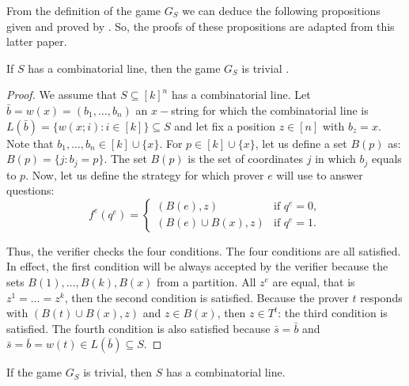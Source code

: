 From the definition of the game $G_S$ we can deduce the following propositions given and proved by \cite{hkazla2016forbidden}. So, the proofs of these propositions are adapted from this latter paper.  
\begin{pro} If $S$ has a combinatorial line, then the game $G_S$ is trivial	. \label{pr1}	\end{pro}
\begin{proof}
We assume that $S \subseteq [k]^n$ has a combinatorial line. 
Let $\bar{b}=w(x)=(b_1,\ldots, b_n)$ an $x-$string for which the  combinatorial line is $L(\bar{b})=\{w(x;i): i \in [k]\} \subseteq S$ and let fix a position $z \in [n]$ with $b_z=x$. Note that $b_1,\ldots, b_n \in [k] \cup \{x\}$. For $p \in [k] \cup \{x\}$, let us define a set $B(p)$ as: $B(p)=\{j: b_j=p\}$. The set $B(p)$ is the set of coordinates $j$ in which $b_j$ equals  to $p.$ Now, let us define the  strategy for which prover $e$ will use to answer questions:
$$ f^e(q^e)=\left\lbrace \begin{array}{ll} (B(e),z) & \text{if } q^e=0, \\ (B(e) \cup B(x), z) & \text{if } q^e=1.\end{array} \right. $$

Thus, the verifier checks the four conditions. The four conditions are all satisfied. In effect, the  first condition will be  always accepted by the verifier   because the sets $B(1), \ldots, B(k), B(x)$ from a partition. All $z^e$ are equal, that is $z^1=\ldots=z^k$, then the second condition is satisfied. Because the prover $t$ responds with  $(B(t) \cup B(x), z)$ and $z \in B(x)$, then $z \in T^t$: the third condition is satisfied. The fourth condition is also satisfied because $\bar{s}=\bar{b}$ and $\bar{s}=\bar{b} =w(t) \in L(\bar{b}) \subseteq S.$
\end{proof}

\begin{pro} If the game $G_S$ is trivial, then $S$ has a combinatorial line.	 \label{pr2}	\end{pro}

